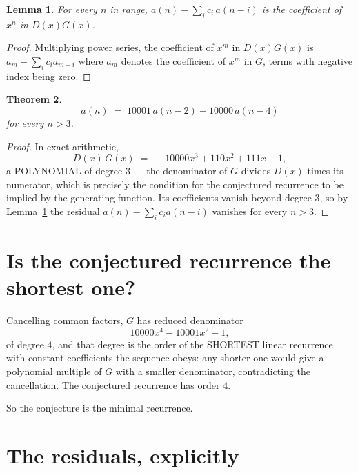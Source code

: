 \documentclass[11pt,a4paper]{article}
\theoremstyle{plain}
\newtheorem{theorem}{Theorem}
\newtheorem{lemma}[theorem]{Lemma}
\theoremstyle{definition}
\begin{document}
\begin{lemma}\label{lem:key}
For every $n$ in range, $a(n)-\sum_i c_i\,a(n-i)$ is the coefficient of $x^{n}$ in
$D(x)G(x)$.
\end{lemma}

\begin{proof}
Multiplying power series, the coefficient of $x^{m}$ in $D(x)G(x)$ is
$a_m-\sum_i c_i a_{m-i}$ where $a_m$ denotes the coefficient of $x^{m}$ in $G$, terms with
negative index being zero.
\end{proof}

\begin{theorem}
\[
a(n)\;=\;10001\,a(n-2) - 10000\,a(n-4)
\]
for every $n>3$.
\end{theorem}

\begin{proof}
In exact arithmetic,
\[
D(x)\,G(x)\;=\;- 10000 x^{3} + 110 x^{2} + 111 x + 1,
\]
a POLYNOMIAL of degree $3$ --- the denominator of $G$ divides $D(x)$ times its numerator,
which is precisely the condition for the conjectured recurrence to be implied by the
generating function. Its coefficients vanish beyond degree $3$, so by
Lemma~\ref{lem:key} the residual $a(n)-\sum_ic_ia(n-i)$ vanishes for every
$n>3$.
\end{proof}

\section{Is the conjectured recurrence the shortest one?}

Cancelling common factors, $G$ has reduced denominator
\[
10000 x^{4} - 10001 x^{2} + 1,
\]
of degree $4$, and that degree is the order of the SHORTEST linear recurrence with
constant coefficients the sequence obeys: any shorter one would give a polynomial multiple of
$G$ with a smaller denominator, contradicting the cancellation. The conjectured recurrence has
order $4$.

So the conjecture is the minimal recurrence.

\section{The residuals, explicitly}
\end{document}
